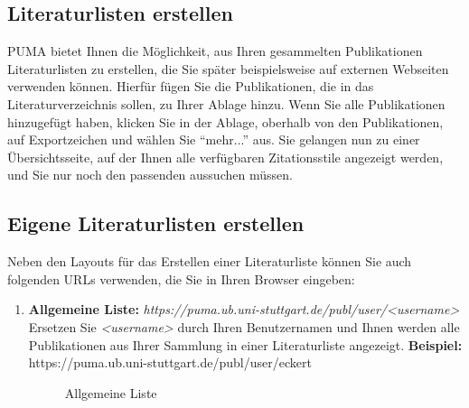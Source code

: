 \begin{description}
\section{Literaturlisten erstellen}
PUMA bietet Ihnen die Möglichkeit, aus Ihren gesammelten Publikationen Literaturlisten zu erstellen, die Sie später beispielsweise auf externen Webseiten verwenden können. \newline
Hierfür fügen Sie die Publikationen, die in das Literaturverzeichnis sollen, zu Ihrer Ablage hinzu. Wenn Sie alle Publikationen hinzugefügt haben, klicken Sie in der Ablage, oberhalb von den Publikationen, auf Exportzeichen und wählen Sie \enquote{mehr...} aus. Sie gelangen nun zu einer Übersichtsseite, auf der Ihnen alle verfügbaren Zitationsstile angezeigt werden, und Sie nur noch den passenden aussuchen müssen. 
\subsection{Eigene Literaturlisten erstellen} 
Neben den Layouts für das Erstellen einer Literaturliste können Sie auch folgenden URLs verwenden, die Sie in Ihren Browser eingeben:
\begin{enumerate}%
    \item \textbf{Allgemeine Liste:}\newline
    \textit{https://puma.ub.uni-stuttgart.de/publ/user/<username>} \newline
    Ersetzen Sie \textit{<username>} durch Ihren Benutzernamen und Ihnen werden alle Publikationen aus Ihrer Sammlung in einer Literaturliste angezeigt.\newline
    \textbf{Beispiel:} https://puma.ub.uni-stuttgart.de/publ/user/eckert 
\begin{figure}[h!]
 \centering
 \caption{Allgemeine Liste}
 \label{figure035}
\end{figure}


\end{enumerate}
\end{description}
